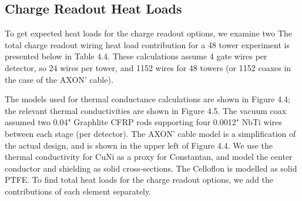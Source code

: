 \documentclass{report}
\begin{document}
\subsection{Charge Readout Heat Loads}

To get expected heat loads for the charge readout options, we examine two
The total charge readout wiring heat load contribution for a 48 tower experiment is presented below in Table 4.4. These calculations assume 4 gate wires per detector, so 24 wires per tower, and 1152 wires for 48 towers (or 1152 coaxes in the case of the AXON' cable).

The models used for thermal conductance calculations are shown in Figure 4.4; the relevant thermal conductivities are shown in Figure 4.5. The vacuum coax assumed two 0.04" Graphlite CFRP rods supporting four 0.0012" NbTi wires between each stage (per detector). The AXON' cable model is a simplification of the actual design, and is shown in the upper left of Figure 4.4. We use the thermal conductivity for CuNi as a proxy for Constantan, and model the center conductor and shielding as solid cross-sections. The Celloflon is modelled as solid PTFE. To find total heat loads for the charge readout options, we add the contributions of each element separately.
\end{document}
